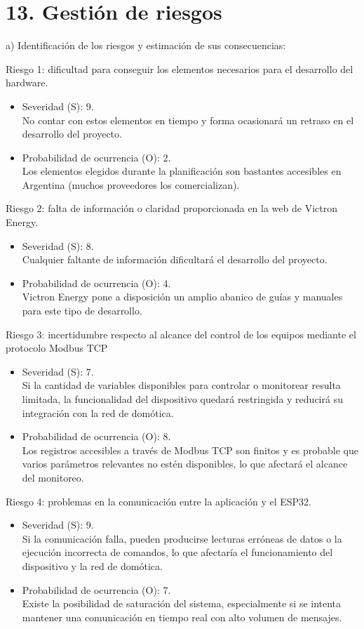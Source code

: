 \documentclass[
11pt, %
]{charter}
\begin{document}
\section{13. Gestión de riesgos}
\label{sec:riesgos}

a) Identificación de los riesgos y estimación de sus consecuencias:

Riesgo 1: dificultad para conseguir los elementos necesarios para el desarrollo del hardware.
\begin{itemize}
	\item Severidad (S): 9.\\
	No contar con estos elementos en tiempo y forma ocasionará un retraso en el desarrollo del proyecto.
	\item Probabilidad de ocurrencia (O): 2.\\
	Los elementos elegidos durante la planificación son bastantes accesibles en Argentina (muchos proveedores los comercializan).
\end{itemize}

Riesgo 2: falta de información o claridad proporcionada en la web de Victron Energy.
\begin{itemize}
	\item Severidad (S): 8.\\
	Cualquier faltante de información dificultará el desarrollo del proyecto.
	\item Probabilidad de ocurrencia (O): 4.\\
	Victron Energy pone a disposición un amplio abanico de guías y manuales para este tipo de desarrollo.
\end{itemize}      

Riesgo 3: incertidumbre respecto al alcance del control de los equipos mediante el protocolo Modbus TCP
\begin{itemize}
	\item Severidad (S): 7.\\
	Si la cantidad de variables disponibles para controlar o monitorear resulta limitada, la funcionalidad del dispositivo quedará restringida y reducirá su integración con la red de domótica.
	\item Probabilidad de ocurrencia (O): 8.\\
	Los registros accesibles a través de Modbus TCP son finitos y es probable que varios parámetros relevantes no estén disponibles, lo que afectará el alcance del monitoreo.
\end{itemize}  

Riesgo 4: problemas en la comunicación entre la aplicación y el ESP32.
\begin{itemize}
	\item Severidad (S): 9.\\
	Si la comunicación falla, pueden producirse lecturas erróneas de datos o la ejecución incorrecta de comandos, lo que afectaría el funcionamiento del dispositivo y la red de domótica.
	\item Probabilidad de ocurrencia (O): 7.\\
	 Existe la posibilidad de saturación del sistema, especialmente si se intenta mantener una comunicación en tiempo real con alto volumen de mensajes.
\end{itemize}
\end{document}
